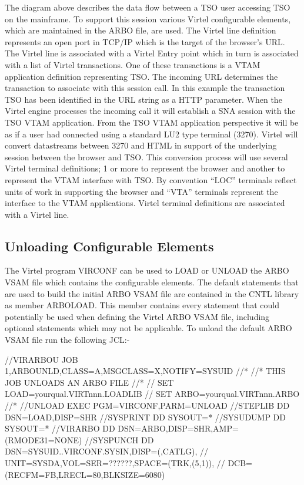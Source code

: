 \documentclass[letterpaper,10pt,english]{sphinxmanual}
\begin{document}


The diagram above describes the data flow between a TSO user accessing TSO on the mainframe. To support this session various Virtel configurable elements, which are maintained in the ARBO file, are used. The Virtel line definition represents an open port in TCP/IP which is the target of the browser’s URL. The Virtel line is associated with a Virtel Entry point which in turn is associated with a list of Virtel transactions. One of these transactions is a VTAM application definition representing TSO. The incoming URL determines the transaction to associate with this session call. In this example the transaction TSO has been identified in the URL string as a HTTP parameter. When the Virtel engine processes the incoming call it will establish a SNA session with the TSO VTAM application. From the TSO VTAM application perspective it will be as if a user had connected using a standard LU2 type terminal (3270). Virtel will convert datastreams between 3270 and HTML in support of the underlying session between the browser and TSO. This conversion process will use several Virtel terminal definitions; 1 or more to represent the browser and another to represent the VTAM interface with TSO. By convention “LOC” terminals reflect units of work in supporting the browser and “VTA” terminals represent the interface to the VTAM applications. Virtel terminal definitions are associated with a Virtel line.


\subsection{Unloading Configurable Elements}
\label{\detokenize{connectivity_guide:unloading-configurable-elements}}
The Virtel program VIRCONF can be used to LOAD or UNLOAD the ARBO VSAM file which contains the configurable elements. The default statements that are used to build the initial ARBO VSAM file are contained in the CNTL library as member ARBOLOAD. This member contains every statement that could potentially be used when defining the Virtel ARBO VSAM file, including optional statements which may not be applicable. To unload the default ARBO VSAM file run the following JCL:-

\begin{sphinxVerbatim}[commandchars=\\\{\}]
//VIRARBOU JOB 1,ARBOUNLD,CLASS=A,MSGCLASS=X,NOTIFY=\PYGZam{}SYSUID
//*
//* THIS JOB UNLOADS AN ARBO FILE
//*
// SET LOAD=yourqual.VIRTnnn.LOADLIB
// SET ARBO=yourqual.VIRTnnn.ARBO
//*
//UNLOAD  EXEC PGM=VIRCONF,PARM=UNLOAD
//STEPLIB  DD  DSN=\PYGZam{}LOAD,DISP=SHR
//SYSPRINT DD  SYSOUT=*
//SYSUDUMP DD  SYSOUT=*
//VIRARBO  DD  DSN=\PYGZam{}ARBO,DISP=SHR,AMP=(\PYGZsq{}RMODE31=NONE\PYGZsq{})
//SYSPUNCH DD  DSN=\PYGZam{}SYSUID..VIRCONF.SYSIN,DISP=(,CATLG),
//             UNIT=SYSDA,VOL=SER=??????,SPACE=(TRK,(5,1)),
//             DCB=(RECFM=FB,LRECL=80,BLKSIZE=6080)
\end{sphinxVerbatim}
\end{document}
